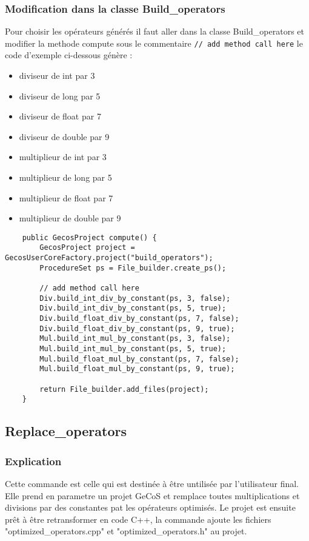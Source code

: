 \documentclass[10pt,a4paper,twoside]{article}
\begin{document}
\subsubsection{Modification dans la classe Build\_operators} 
Pour choisir les opérateurs générés il faut aller dans la classe Build\_operators
et modifier la methode compute sous le commentaire \verb=// add method call here= le code d'exemple ci-dessous génère :
\begin{itemize}
	\item diviseur de int par 3
	\item diviseur de long par 5
	\item diviseur de float par 7
	\item diviseur de double par 9
	\item multiplieur de int par 3
	\item multiplieur de long par 5
	\item multiplieur de float par 7
	\item multiplieur de double par 9
\end{itemize}
\begin{verbatim}
	public GecosProject compute() {
		GecosProject project = GecosUserCoreFactory.project("build_operators");
		ProcedureSet ps = File_builder.create_ps();
		
		// add method call here
		Div.build_int_div_by_constant(ps, 3, false);
		Div.build_int_div_by_constant(ps, 5, true);
		Div.build_float_div_by_constant(ps, 7, false);
		Div.build_float_div_by_constant(ps, 9, true);
		Mul.build_int_mul_by_constant(ps, 3, false);
		Mul.build_int_mul_by_constant(ps, 5, true);
		Mul.build_float_mul_by_constant(ps, 7, false);
		Mul.build_float_mul_by_constant(ps, 9, true);
		
		return File_builder.add_files(project);		
	}
\end{verbatim} 

\subsection{Replace\_operators}
\subsubsection{Explication}
Cette commande est celle qui est destinée à être untilisée par l'utilisateur final. Elle prend en 
parametre un projet GeCoS et remplace toutes multiplications et divisions par des constantes pat les opérateurs optimisés. Le
projet est ensuite prêt à être retransformer en code C++, la commande ajoute les fichiers "optimized\_operators.cpp" et 
"optimized\_operators.h" au projet.
\end{document}
